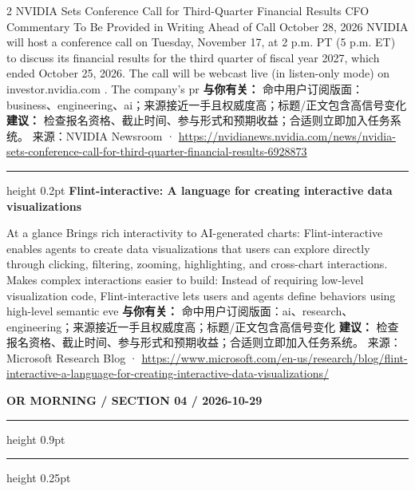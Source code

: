 \documentclass[10.5pt]{ctexart}
\begin{document}
\begin{multicols}{2}
NVIDIA Sets Conference Call for Third-Quarter Financial Results CFO Commentary To Be Provided in Writing Ahead of Call October 28, 2026 NVIDIA will host a conference call on Tuesday, November 17, at 2 p.m. PT (5 p.m. ET) to discuss its financial results for the third quarter of fiscal year 2027, which ended October 25, 2026. The call will be webcast live (in listen-only mode) on investor.nvidia.com . The company’s pr
\textbf{与你有关：} 命中用户订阅版面：business、engineering、ai；来源接近一手且权威度高；标题/正文包含高信号变化
\textbf{建议：} 检查报名资格、截止时间、参与形式和预期收益；合适则立即加入任务系统。
{\footnotesize\color{ormuted} 来源：NVIDIA Newsroom · \url{https://nvidianews.nvidia.com/news/nvidia-sets-conference-call-for-third-quarter-financial-results-6928873}}
\vspace{2mm}
\hrule height 0.2pt
\vspace{2mm}
{\large\bfseries Flint-interactive: A language for creating interactive data visualizations}\par
At a glance Brings rich interactivity to AI-generated charts: Flint-interactive enables agents to create data visualizations that users can explore directly through clicking, filtering, zooming, highlighting, and cross-chart interactions. Makes complex interactions easier to build: Instead of requiring low-level visualization code, Flint-interactive lets users and agents define behaviors using high-level semantic eve
\textbf{与你有关：} 命中用户订阅版面：ai、research、engineering；来源接近一手且权威度高；标题/正文包含高信号变化
\textbf{建议：} 检查报名资格、截止时间、参与形式和预期收益；合适则立即加入任务系统。
{\footnotesize\color{ormuted} 来源：Microsoft Research Blog · \url{https://www.microsoft.com/en-us/research/blog/flint-interactive-a-language-for-creating-interactive-data-visualizations/}}
\end{multicols}
\newpage
{\small\bfseries OR MORNING / SECTION 04 / 2026-10-29}
\vspace{2mm}
\hrule height 0.9pt
\vspace{1.5mm}
\hrule height 0.25pt
\vspace{4mm}
\end{document}
